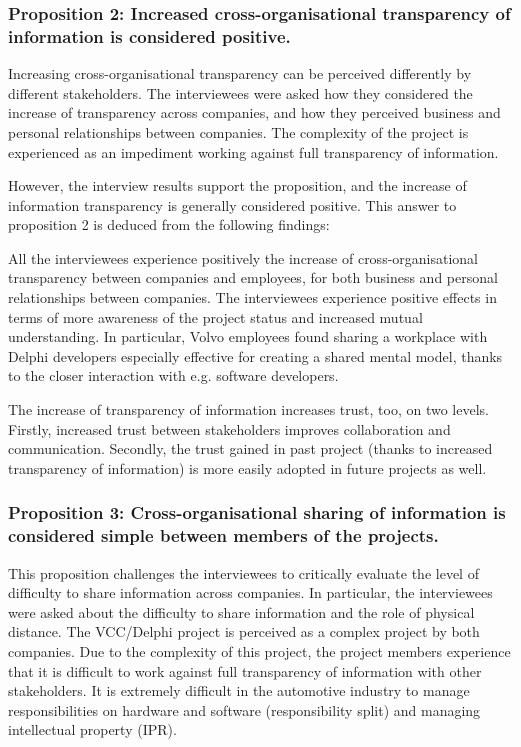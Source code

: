 \subsubsection{Proposition 2: Increased cross-organisational transparency of information is considered positive.}

Increasing cross-organisational transparency can be perceived differently by different stakeholders. The interviewees were asked how they considered the increase of transparency across companies, and how they perceived business and personal relationships between companies. The complexity of the project is experienced as an impediment working against full transparency of information.

However, the interview results support the proposition, and the increase of information transparency is generally considered positive. This answer to proposition 2 is deduced from the following findings:

 All the interviewees experience positively the increase of cross-organisational transparency between companies and employees, for both business and personal relationships between companies. The interviewees experience positive effects in terms of more awareness of the project status and increased mutual understanding. In particular, Volvo employees found sharing a workplace with Delphi developers especially effective for creating a shared mental model, thanks to the closer interaction with e.g. software developers.

 The increase of transparency of information increases trust, too, on two levels. Firstly, increased trust between stakeholders improves collaboration and communication. Secondly, the trust gained in past project (thanks to increased transparency of information) is more easily adopted in future projects as well. 

\subsubsection{Proposition 3: Cross-organisational sharing of information is considered simple between members of the projects.}

This proposition challenges the interviewees to critically evaluate the level of difficulty to share information across companies. In particular, the interviewees were asked about the difficulty to share information and the role of physical distance. The VCC/Delphi project is perceived as a complex project by both companies. Due to the complexity of this project, the project members experience that it is difficult to work against full transparency of information with other stakeholders. It is extremely difficult in the automotive industry to manage responsibilities on hardware and software (responsibility split) and managing intellectual property (IPR).

